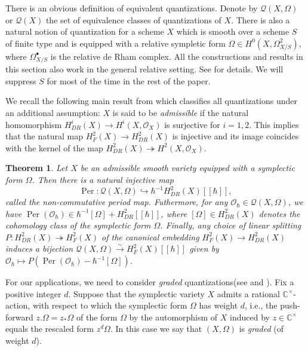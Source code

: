 \documentclass[12pt]{amsart}
\newcommand{\C}{\mathbb{C}}
\newcommand{\quan}{\mathcal{Q}}
\newcommand{\per}{\operatorname{Per}}
\newcommand{\cm}{\C^\times}
\newcommand{\OO}{\mathcal{O}}
\newtheorem{Thm}{Theorem}[subsection]
\theoremstyle{definition}
\numberwithin{equation}{section}
\begin{document}
There is an obvious definition of equivalent quantizations. Denote by $\quan(X,\Omega)$ or $\quan(X)$ the set of equivalence classes of quantizations of $X$. There is also a natural notion of quantization for a scheme $X$ which is smooth over a scheme $S$ of finite type and is equipped with a relative sympletic form $\Omega \in H^0(X, \Omega^2_{X/S})$, where $\Omega^\bullet_{X/S}$ is the relative de Rham complex. All the constructions and results in this section also work in the general relative setting. See \cite{BK} for details. We will suppress $S$ for most of the time in the rest of the paper.

We recall the following main result from \cite[Theorem 1.8]{BK} which classifies all quantizations under an additional assumption: $X$ is said to be {\it admissible} if the natural homomorphism $H^i_{DR}(X) \to H^i(X, \OO_X)$ is surjective for $i = 1, 2$. This implies that the natural map $H^2_F(X) \to H^2_{DR}(X)$ is injective and its image coincides with the kernel of the map $H^2_{DR}(X) \twoheadrightarrow H^2(X, \OO_X)$.

\begin{Thm}\label{thm:quan_BK}
	Let $X$ be an admissible smooth variety equipped with a symplectic form $\Omega$. Then there is a natural injective map
	\[  \per: \quan(X, \Omega) \hookrightarrow \hbar^{-1} H^2_{DR}(X) [[\hbar]],   \]
	called the {non-commutative period map}. Futhermore, for any $\OO_\hbar \in \quan(X,\Omega)$, we have $\per(\OO_\hbar) \in \hbar^{-1} [\Omega] + H^2_{DR}[[\hbar]]$, where $[\Omega] \in H^2_{DR}(X)$ denotes the cohomology class of the symplectic form $\Omega$. Finally, any choice of linear splitting $P: H^2_{DR}(X) \twoheadrightarrow H^2_F(X)$ of the canonical embedding $H^2_F(X) \to H^2_{DR}(X)$ induces a bijection $\quan(X, \Omega) \xrightarrow{\sim} H^2_F(X)[[\hbar]]$ given by $\OO_\hbar \mapsto P( \per(\OO_\hbar) - \hbar^{-1} [\Omega])$.
\end{Thm}

For our applications, we need to consider \emph{graded} quantizations(see \cite[Section, 2.2]{quant_iso} \cite[Section 3.1]{orbit}  and \cite[Section 3.2]{BPW}). Fix a positive integer $d$.  Suppose that the symplectic variety $X$ admits a rational $\cm$-action, with respect to which the symplectic form $\Omega$ has weight $d$, i.e., the push-forward $z.\Omega = z_* \Omega$ of the form $\Omega$ by the automorphism of $X$ induced by $z \in \cm$ equals the rescaled form $z^d\Omega$. In this case we say that $(X,\Omega)$ is \emph{graded} (of weight $d$).
\end{document}
